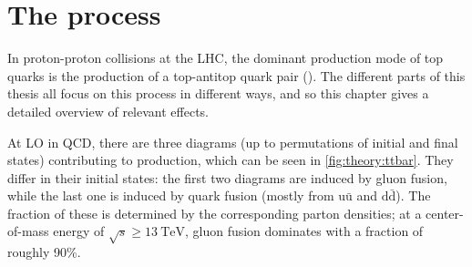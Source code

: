 \section{The \texorpdfstring{\pptt}{pp -> tt} process}
\label{sec:theory:ttbar}

In proton-proton collisions at the LHC, the dominant production mode of top quarks is the production of a top-antitop quark pair (\ttbar). The different parts of this thesis all focus on this process in different ways, and so this chapter gives a detailed overview of relevant effects.

At LO in QCD, there are three diagrams (up to permutations of initial and final states) contributing to \ttbar production, which can be seen in \cref{fig:theory:ttbar}. They differ in their initial states: the first two diagrams are induced by gluon fusion, while the last one is induced by quark fusion (mostly from $\mathrm{u \bar{u}}$ and $\mathrm{d \bar{d}}$). The fraction of these is determined by the corresponding parton densities; at a center-of-mass energy of $\sqrt{s} \geq \SI{13}{\TeV}$, gluon fusion dominates with a fraction of roughly 90\%.

